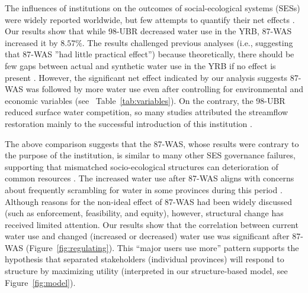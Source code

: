 
\label{discussion-1}
The influences of institutions on the outcomes of social-ecological systems (SESs) were widely reported worldwide, but few attempts to quantify their net effects \cite{cumming2020a}.
Our results show that while 98-UBR decreased water use in the YRB, 87-WAS increased it by $8.57\%$.
The results challenged previous analyses (i.e., suggesting that 87-WAS ''had little practical effect'') because theoretically, there should be few gaps between actual and synthetic water use in the YRB if no effect is present \cite{abadie2015,hill2021}.
However, the significant net effect indicated by our analysis suggests 87-WAS was followed by more water use even after controlling for environmental and economic variables (see \textit{}~Table~\ref{tab:variables}).
On the contrary, the 98-UBR reduced surface water competition, so many studies attributed the streamflow restoration mainly to the successful introduction of this institution \cite{chen2021,huangang2002,an2007}.

\label{discussion-2}
The above comparison suggests that the 87-WAS, whose results were contrary to the purpose of the institution, is similar to many other SES governance failures, supporting that mismatched socio-ecological structures can deterioration of common resources \cite{kellenberg2009,cai2016,barnes2019}.
The increased water use after 87-WAS aligns with concerns about frequently scrambling for water in some provinces during this period \cite{mao2000, bouckaert2022}.
Although reasons for the non-ideal effect of 87-WAS had been widely discussed \cite{huangang2002} (such as enforcement, feasibility, and equity), however, structural change has received limited attention.
Our results show that the correlation between current water use and changed (increased or decreased) water use was significant after 87-WAS (Figure~\ref{fig:regulating}).
This ``major users use more'' pattern supports the hypothesis that separated stakeholders (individual provinces) will respond to structure by maximizing utility (interpreted in our structure-based model, see Figure~\ref{fig:model}).

